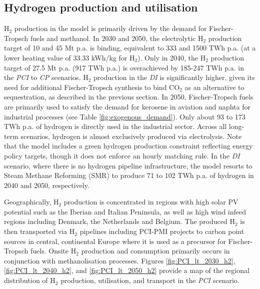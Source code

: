 \documentclass[pdflatex,sn-nature]{sn-jnl}
\theoremstyle{thmstyleone}%
\theoremstyle{thmstyletwo}%
\theoremstyle{thmstylethree}%
\begin{document}
\subsection{Hydrogen production and utilisation}
H$_2$ production in the model is primarily driven by the demand for Fischer-Tropsch fuels and methanol. In 2030 and 2050, the electrolytic H$_2$ production target of 10 and 45 Mt p.a. is binding, equivalent to 333 and 1500 TWh p.a. (at a lower heating value of 33.33 kWh/kg for H$_2$). Only in 2040, the H$_2$ production target of 27.5 Mt p.a. (917 TWh p.a.) is overachieved by 185-247 TWh p.a. in the \textit{PCI} to \textit{CP} scenarios. H$_2$ production in the \textit{DI} is significantly higher, given its need for additional Fischer-Tropsch synthesis to bind CO$_2$ as an alternative to sequestration, as described in the previous section.
In 2050, Fischer-Tropsch fuels are primarily used to satisfy the demand for kerosene in aviation and naphta for industrial processes (see Table \ref{fig:exogenous_demand}). Only about 93 to 173 TWh p.a. of hydrogen is directly used in the industrial sector. Across all long-term scenarios, hydrogen is almost exclusively produced via electrolysis. Note that the model includes a green hydrogen production constraint reflecting energy policy targets, though it does not enforce an hourly matching rule.
In the \textit{DI} scenario, where there is no hydrogen pipeline infrastructure, the model resorts to Steam Methane Reforming (SMR) to produce 71 to 102 TWh p.a. of hydrogen in 2040 and 2050, respectively.

Geographically, H$_2$ production is concentrated in regions with high solar PV potential such as the Iberian and Italian Peninsula, as well as high wind infeed regions including Denmark, the Netherlands and Belgium. The produced H$_2$ is then transported via H$_2$ pipelines including PCI-PMI projects to carbon point sources  in central, continental Europe where it is used as a precursor for Fischer-Tropsch fuels. Onsite H$_2$ production and consumption primarily occurs in conjunction with methanolisation processes. Figures \ref{fig:PCI_lt_2030_h2}, \ref{fig:PCI_lt_2040_h2}, and \ref{fig:PCI_lt_2050_h2} provide a map of the regional distribution of H$_2$ production, utilisation, and transport in the \textit{PCI} scenario.
\end{document}
